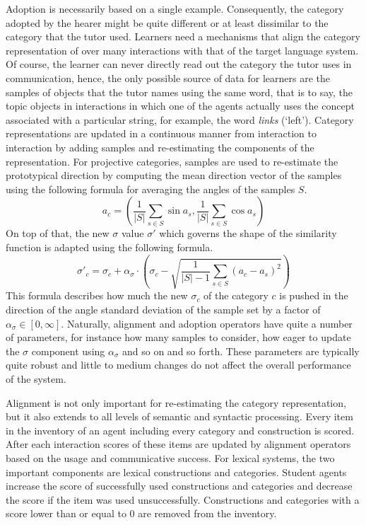Adoption is necessarily based on a single example. Consequently, the category
adopted by the hearer might be quite different or at least dissimilar to the category
that the tutor used. Learners need a mechanisms that align the category 
representation of over many interactions with that of the target language system. 
Of course, the learner can never directly read out 
the category the tutor uses in communication, hence, the only possible source of 
data for learners are the samples of objects that the tutor names using the same word, 
that is to say, the topic objects in interactions in which one of the agents actually uses 
the concept associated with a particular string, for example, the word {\itshape links} (`left'). Category representations are updated in a continuous manner 
from interaction to interaction by adding samples and re-estimating the components of 
the representation. For projective categories, samples are used to 
re-estimate the prototypical direction by computing the mean direction vector of 
the samples using the following formula for averaging the angles of the samples $S$.
\begin{equation}
a_c = 
\left(\frac{1}{|S|}\sum_{s\in S}\sin a_s,\frac{1}{|S|}\sum_{s\in S}\cos a_s\right)
\label{e:update-a}
\end{equation} 
On top of that, the new $\sigma$ value $\sigma'$ 
which governs the shape of the similarity function is adapted using the following formula.
\begin{equation}
\sigma'_c = \sigma_c + \alpha_\sigma \cdot \left(\sigma_c - \sqrt{\frac{1}{|S|-1}\sum_{s\in S}(a_c - a_s)^2}\right)
\label{e:update-sigma-a}
\end{equation} 
This formula describes how much the new $\sigma_c$ of the category $c$ 
is pushed in the direction of the angle standard deviation of the sample set 
by a factor of $\alpha_\sigma \in [0,\infty]$. Naturally, alignment and
adoption operators have quite a number of parameters, for instance
how many samples to consider, how eager to update the $\sigma$ component using
$\alpha_\sigma$ and so on and so forth. These parameters are typically quite robust and little to
medium changes do not affect the overall performance of the system.

Alignment is not only important for re-estimating the category representation,
but it also extends to all levels of semantic and syntactic processing. Every item 
in the inventory of an agent including every category and construction is scored. 
After each interaction scores of these items are updated by alignment operators 
based on the usage and communicative success. 
For lexical systems, the two important components are
lexical constructions and categories. Student agents increase the score of successfully
used constructions and categories and decrease the score 
if the item was used unsuccessfully. Constructions and categories with 
a score lower than or equal to $0$ are removed from the inventory. 

